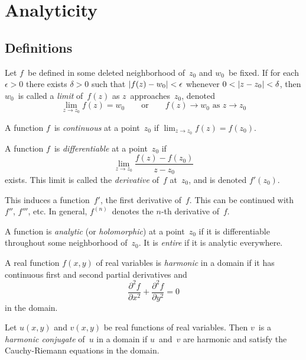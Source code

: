%
%
%
\section{Analyticity}
\subsection*{Definitions}
\begin{defn}
Let \(f\)~be defined in some deleted neighborhood of~\(z_0\) and \(w_0\)~be fixed. If for each \(\epsilon>0\) there exists \(\delta>0\) such that \(|{f(z)-w_0}|<\epsilon\) whenever \(0<\abs{z-z_0}<\delta\), then \(w_0\)~is called a \emph{limit} of~\(f(z)\) as \(z\)~approaches~\(z_0\), denoted
\[\lim_{z\to z_0}f(z)=w_0\qquad\text{or}\qquad f(z)\to w_0\text{ as }z\to z_0\]
\end{defn}

\begin{defn}
A function \(f\)~is \emph{continuous} at a point~\(z_0\) if \(\lim_{z\to z_0}f(z)=f(z_0)\).
\end{defn}

\begin{defn}
A function \(f\)~is \emph{differentiable} at a point~\(z_0\) if
\[\lim_{z\to z_0}\frac{f(z)-f(z_0)}{z-z_0}\]
exists. This limit is called the \emph{derivative} of~\(f\) at~\(z_0\), and is denoted \(f'(z_0)\).

This induces a function~\(f'\), the first derivative of~\(f\). This can be continued with \(f''\), \(f'''\), etc. In general, \(f^{(n)}\)~denotes the \(n\)-th derivative of~\(f\).
\end{defn}

\begin{defn}
A function is \emph{analytic} (or \emph{holomorphic}) at a point~\(z_0\) if it is differentiable throughout some neighborhood of~\(z_0\). It is \emph{entire} if it is analytic everywhere.
\end{defn}

\begin{defn}
A real function \(f(x,y)\) of real variables is \emph{harmonic} in a domain if it has continuous first and second partial derivatives and
\[\frac{\partial^2 f}{\partial x^2}+\frac{\partial^2 f}{\partial y^2}=0\]
in the domain.
\end{defn}

\begin{defn}
Let \(u(x,y)\) and \(v(x,y)\) be real functions of real variables. Then \(v\)~is a \emph{harmonic conjugate} of~\(u\) in a domain if \(u\)~and~\(v\) are harmonic and satisfy the Cauchy-Riemann equations in the domain.
\end{defn}

